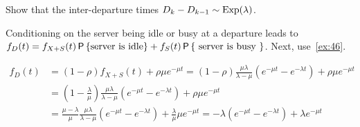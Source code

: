 \documentclass[queueing-book.tex]{subfiles}
\begin{document}
\begin{exercise}\label{ex:63}
Show that the inter-departure times $D_k -D_{k-1} \sim \Exp{\lambda}$.
\begin{hint}
Conditioning on the server being idle or busy at a departure leads to
$f_D(t) = f_{X+S}(t) \P{\text{server is idle}} + f_S(t) \P{\text{ server is busy }}$.
Next, use~\cref{ex:46}.
\end{hint}
\begin{solution}
 \begin{align*}
 f_D(t)
&= (1-\rho) f_{X+S}(t) + \rho \mu e^{-\mu t}
= (1-\rho) \frac{\mu\lambda}{\lambda-\mu} \left(e^{-\mu t}-e^{-\lambda t}\right) + \rho \mu e^{-\mu t} \\
&= \left(1-\frac{\lambda}\mu\right) \frac{\mu\lambda}{\lambda-\mu}\left(e^{-\mu t}-e^{-\lambda t}\right) + \rho \mu e^{-\mu t} \\
&= \frac{\mu-\lambda}\mu \frac{\mu\lambda}{\lambda-\mu}\left(e^{-\mu t}-e^{-\lambda t}\right) + \frac\lambda \mu \mu e^{-\mu t}
= - \lambda\left(e^{-\mu t}-e^{-\lambda t}\right) + \lambda e^{-\mu t}
 \end{align*}
\end{solution}
\end{exercise}
\end{document}
